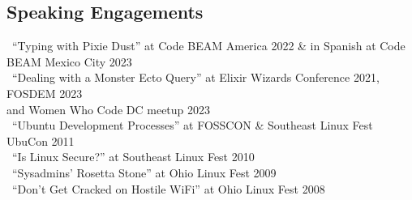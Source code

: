 \documentclass[line, letterpaper]{res}
\begin{document}
\begin{resume}
	\section{Speaking Engagements}
			\textbullet \ ``Typing with Pixie Dust'' at Code BEAM America 2022 \& in Spanish at Code BEAM Mexico City 2023\\
			\textbullet \ ``Dealing with a Monster Ecto Query'' at Elixir Wizards Conference 2021, FOSDEM 2023\\     
			\hspace*{0.25in}and Women Who Code DC meetup 2023\\
			\textbullet \ ``Ubuntu Development Processes'' at FOSSCON \& Southeast Linux Fest UbuCon 2011\\
			\textbullet \ ``Is Linux Secure?'' at Southeast Linux Fest 2010\\
			\textbullet \ ``Sysadmins' Rosetta Stone'' at Ohio Linux Fest 2009\\
			\textbullet \ ``Don't Get Cracked on Hostile WiFi'' at Ohio Linux Fest 2008\\

			
			
			
			


\end{resume}
\end{document}
